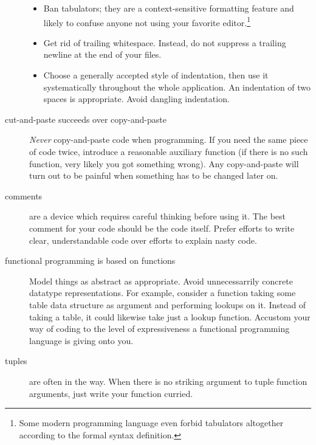 \begin{isabellebody}
\begin{isamarkuptext}
\begin{description}
\begin{itemize}
        \item Ban tabulators; they are a context-sensitive formatting
          feature and likely to confuse anyone not using your favorite
          editor.\footnote{Some modern programming language even
          forbid tabulators altogether according to the formal syntax
          definition.}

        \item Get rid of trailing whitespace.  Instead, do not
          suppress a trailing newline at the end of your files.

        \item Choose a generally accepted style of indentation,
          then use it systematically throughout the whole
          application.  An indentation of two spaces is appropriate.
          Avoid dangling indentation.

      \end{itemize}

    \item[cut-and-paste succeeds over copy-and-paste]
       \emph{Never} copy-and-paste code when programming.  If you
        need the same piece of code twice, introduce a
        reasonable auxiliary function (if there is no
        such function, very likely you got something wrong).
        Any copy-and-paste will turn out to be painful 
        when something has to be changed later on.

    \item[comments]
      are a device which requires careful thinking before using
      it.  The best comment for your code should be the code itself.
      Prefer efforts to write clear, understandable code
      over efforts to explain nasty code.

    \item[functional programming is based on functions]
      Model things as abstract as appropriate.  Avoid unnecessarrily
      concrete datatype  representations.  For example, consider a function
      taking some table data structure as argument and performing
      lookups on it.  Instead of taking a table, it could likewise
      take just a lookup function.  Accustom
      your way of coding to the level of expressiveness a functional
      programming language is giving onto you.

    \item[tuples]
      are often in the way.  When there is no striking argument
      to tuple function arguments, just write your function curried.


\end{description}
\end{isamarkuptext}
\end{isabellebody}
